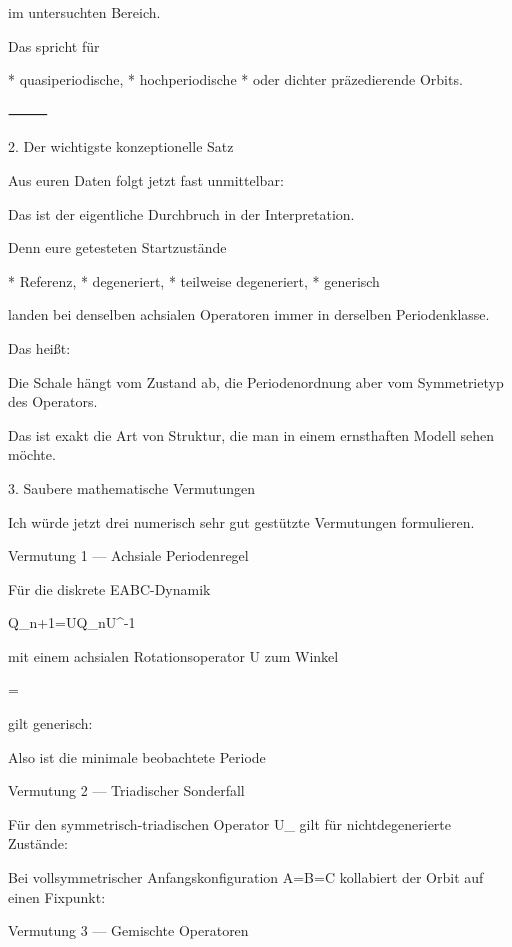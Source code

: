 \documentclass[11pt,a4paper]{article}
\theoremstyle{definition}
\begin{document}
im untersuchten Bereich.

Das spricht für

* quasiperiodische,
* hochperiodische
* oder dichter präzedierende Orbits.

⸻

2. Der wichtigste konzeptionelle Satz

Aus euren Daten folgt jetzt fast unmittelbar:


Das ist der eigentliche Durchbruch in der Interpretation.

Denn eure getesteten Startzustände

* Referenz,
* degeneriert,
* teilweise degeneriert,
* generisch

landen bei denselben achsialen Operatoren immer in derselben Periodenklasse.

Das heißt:

Die Schale hängt vom Zustand ab,
die Periodenordnung aber vom Symmetrietyp des Operators.

Das ist exakt die Art von Struktur, die man in einem ernsthaften Modell sehen möchte.


3. Saubere mathematische Vermutungen

Ich würde jetzt drei numerisch sehr gut gestützte Vermutungen formulieren.

Vermutung 1 — Achsiale Periodenregel

Für die diskrete EABC-Dynamik

Q_{n+1}=UQ_nU^{-1}

mit einem achsialen Rotationsoperator U zum Winkel

\theta=

gilt generisch:


Also ist die minimale beobachtete Periode



Vermutung 2 — Triadischer Sonderfall

Für den symmetrisch-triadischen Operator U_{} gilt für nichtdegenerierte Zustände:


Bei vollsymmetrischer Anfangskonfiguration A=B=C kollabiert der Orbit auf einen Fixpunkt:



Vermutung 3 — Gemischte Operatoren
\end{document}
